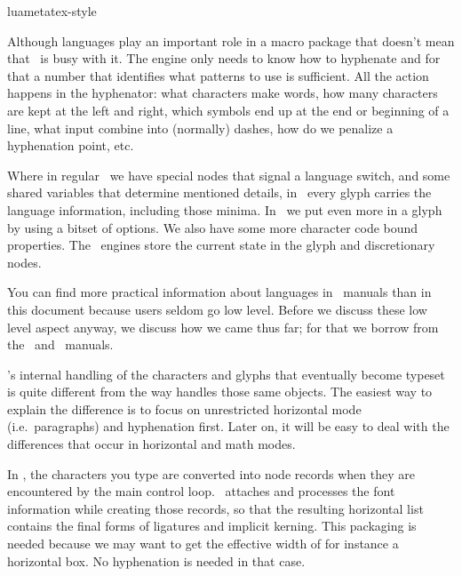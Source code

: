 
\environment luametatex-style

\startdocument[title=Languages]

\startsubject[title=Contents]
    \setups[sectioncontents]
\stopsubject

\startsection[title={Introduction}]

Although languages play an important role in a macro package that doesn't mean
that \TEX\ is busy with it. The engine only needs to know how to hyphenate and
for that a number that identifies what patterns to use is sufficient. All the
action happens in the hyphenator: what characters make words, how many characters
are kept at the left and right, which symbols end up at the end or beginning of a
line, what input combine into (normally) dashes, how do we penalize a hyphenation
point, etc.

Where in regular \TEX\ we have special nodes that signal a language switch, and
some shared variables that determine mentioned details, in \LUATEX\ every glyph
carries the language information, including those minima. In \LUAMETATEX\ we put
even more in a glyph by using a bitset of options. We also have some more
character code bound properties. The \LUATEX\ engines store the current state in
the glyph and discretionary nodes.

You can find more practical information about languages in \CONTEXT\ manuals than
in this document because users seldom go low level. Before we discuss these low
level aspect anyway, we discuss how we came thus far; for that we borrow from the
\LUATEX\ and \LUAMETATEX\ manuals.

\stopsection

\startsection[title={Evolution}]

\LUATEX's internal handling of the characters and glyphs that eventually become
typeset is quite different from the way  handles those same objects. The
easiest way to explain the difference is to focus on unrestricted horizontal mode
(i.e.\ paragraphs) and hyphenation first. Later on, it will be easy to deal
with the differences that occur in horizontal and math modes.

In , the characters you type are converted into  node records
when they are encountered by the main control loop. \TEX\ attaches and processes
the font information while creating those records, so that the resulting \quote
{horizontal list} contains the final forms of ligatures and implicit kerning.
This packaging is needed because we may want to get the effective width of for
instance a horizontal box. No hyphenation is needed in that case.

